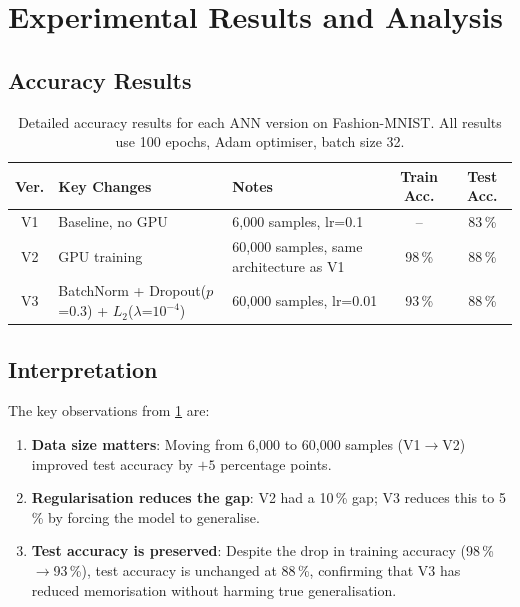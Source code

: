 \documentclass[12pt,a4paper]{article}
\newcommand{\Ltwo}{L_2}
\begin{document}
\section{Experimental Results and Analysis}
\label{sec:results}

\subsection{Accuracy Results}
\label{sec:results:accuracy}

\begin{table}[htbp]
  \centering
  \caption{Detailed accuracy results for each ANN version on Fashion-MNIST.
           All results use 100 epochs, Adam optimiser, batch size 32.}
  \label{tab:results_detail}
  \begin{tabularx}{\linewidth}{clXcc}
    \toprule
    \textbf{Ver.} & \textbf{Key Changes} & \textbf{Notes}
      & \textbf{Train Acc.} & \textbf{Test Acc.} \\
    \midrule
    V1 & Baseline, no GPU
       & 6{,}000 samples, lr=0.1
       & --
       & 83\,\% \\
    \addlinespace
    V2 & GPU training
       & 60{,}000 samples, same architecture as V1
       & 98\,\%
       & 88\,\% \\
    \addlinespace
    V3 & BatchNorm + Dropout($p$=0.3) + $\Ltwo$($\lambda$=$10^{-4}$)
       & 60{,}000 samples, lr=0.01
       & 93\,\%
       & 88\,\% \\
    \bottomrule
  \end{tabularx}
\end{table}

\subsection{Interpretation}
\label{sec:results:interpretation}

The key observations from \cref{tab:results_detail} are:

\begin{enumerate}
  \item \textbf{Data size matters}: Moving from 6{,}000 to 60{,}000 samples
        (V1$\to$V2) improved test accuracy by $+5$ percentage points.
  \item \textbf{Regularisation reduces the gap}: V2 had a 10\,\% gap;
        V3 reduces this to 5\,\% by forcing the model to generalise.
  \item \textbf{Test accuracy is preserved}: Despite the drop in training
        accuracy (98\,\%$\to$93\,\%), test accuracy is unchanged at 88\,\%,
        confirming that V3 has reduced memorisation without harming true
        generalisation.
\end{enumerate}
\end{document}
